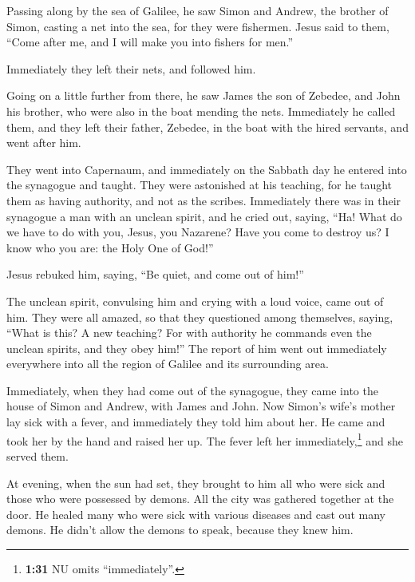  Passing along by the sea of Galilee, he saw Simon and
Andrew, the brother of Simon, casting a net into the sea, for they were
fishermen.  Jesus said to them, ``Come after me, and I
will make you into fishers for men.''

 Immediately they left their nets, and followed him.

 Going on a little further from there, he saw James the
son of Zebedee, and John his brother, who were also in the boat mending
the nets.  Immediately he called them, and they left
their father, Zebedee, in the boat with the hired servants, and went
after him.

 They went into Capernaum, and immediately on the Sabbath
day he entered into the synagogue and taught.  They were
astonished at his teaching, for he taught them as having authority, and
not as the scribes.  Immediately there was in their
synagogue a man with an unclean spirit, and he cried out,
 saying, ``Ha! What do we have to do with you, Jesus, you
Nazarene? Have you come to destroy us? I know who you are: the Holy One
of God!''

 Jesus rebuked him, saying, ``Be quiet, and come out of
him!''

 The unclean spirit, convulsing him and crying with a
loud voice, came out of him.  They were all amazed, so
that they questioned among themselves, saying, ``What is this? A new
teaching? For with authority he commands even the unclean spirits, and
they obey him!''  The report of him went out immediately
everywhere into all the region of Galilee and its surrounding area.

 Immediately, when they had come out of the synagogue,
they came into the house of Simon and Andrew, with James and John.
 Now Simon's wife's mother lay sick with a fever, and
immediately they told him about her.  He came and took
her by the hand and raised her up. The fever left her
immediately,\footnote{\textbf{1:31} NU omits ``immediately''.} and she
served them.

 At evening, when the sun had set, they brought to him
all who were sick and those who were possessed by demons.
 All the city was gathered together at the door.
 He healed many who were sick with various diseases and
cast out many demons. He didn't allow the demons to speak, because they
knew him.


